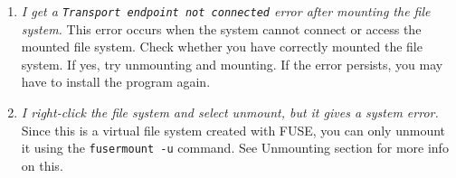 \begin{enumerate}
\item \emph{I get a \texttt{Transport endpoint not connected} error after mounting the file system.} \newline
This error occurs when the system cannot connect or access the mounted file system. Check whether you have correctly mounted the file system. If yes, try unmounting and mounting. If the error persists, you may have to install the program again.
\item \emph{I right-click the file system and select unmount, but it gives a system error.} \newline
Since this is a virtual file system created with FUSE, you can only unmount it using the \texttt{fusermount -u} command. See Unmounting section for more info on this.

\end{enumerate}